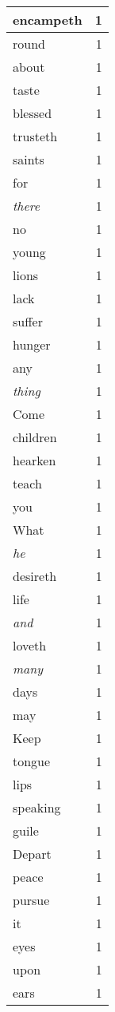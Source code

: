 \begin{center}
\begin{longtable}{l|r}
encampeth & 1 \\ \hline
round & 1 \\ \hline
about & 1 \\ \hline
taste & 1 \\ \hline
blessed & 1 \\ \hline
trusteth & 1 \\ \hline
saints & 1 \\ \hline
for & 1 \\ \hline
\emph{there} & 1 \\ \hline
no & 1 \\ \hline
young & 1 \\ \hline
lions & 1 \\ \hline
lack & 1 \\ \hline
suffer & 1 \\ \hline
hunger & 1 \\ \hline
any & 1 \\ \hline
\emph{thing} & 1 \\ \hline
Come & 1 \\ \hline
children & 1 \\ \hline
hearken & 1 \\ \hline
teach & 1 \\ \hline
you & 1 \\ \hline
What & 1 \\ \hline
\emph{he} & 1 \\ \hline
desireth & 1 \\ \hline
life & 1 \\ \hline
\emph{and} & 1 \\ \hline
loveth & 1 \\ \hline
\emph{many} & 1 \\ \hline
days & 1 \\ \hline
may & 1 \\ \hline
Keep & 1 \\ \hline
tongue & 1 \\ \hline
lips & 1 \\ \hline
speaking & 1 \\ \hline
guile & 1 \\ \hline
Depart & 1 \\ \hline
peace & 1 \\ \hline
pursue & 1 \\ \hline
it & 1 \\ \hline
eyes & 1 \\ \hline
upon & 1 \\ \hline
ears & 1 \\ \hline

\end{longtable}
\end{center}
